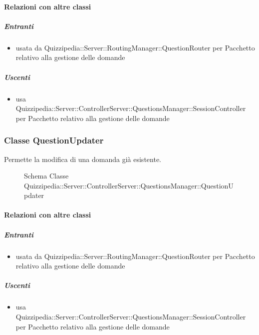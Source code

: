 \paragraph{Relazioni con altre classi}
\subparagraph{Entranti}
\begin{itemize}
\item usata da Quizzipedia::Server::RoutingManager::QuestionRouter per Pacchetto relativo alla gestione delle domande
\end{itemize}
\subparagraph{Uscenti}
\begin{itemize}
\item usa Quizzipedia::Server::ControllerServer::QuestionsManager::SessionController per Pacchetto relativo alla gestione delle domande
\end{itemize}
\subsubsection{Classe QuestionUpdater}
Permette la modifica di una domanda già esistente.
\begin{figure}[H]
\centering
\noindent{}
\caption[Schema Classe QuestionUpdater]{Schema Classe Quizzipedia::Server::ControllerServer::QuestionsManager::QuestionUpdater}
\end{figure}
\paragraph{Relazioni con altre classi}
\subparagraph{Entranti}
\begin{itemize}
\item usata da Quizzipedia::Server::RoutingManager::QuestionRouter per Pacchetto relativo alla gestione delle domande
\end{itemize}
\subparagraph{Uscenti}
\begin{itemize}
\item usa Quizzipedia::Server::ControllerServer::QuestionsManager::SessionController per Pacchetto relativo alla gestione delle domande
\end{itemize}

